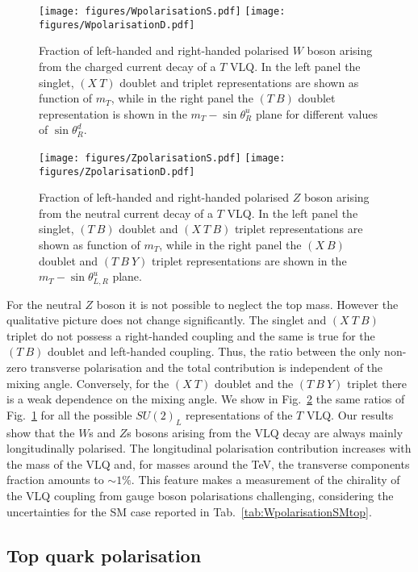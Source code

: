 \documentclass[a4paper]{article}
\begin{document}
\begin{figure}[!htbp]
\centering
\texttt{[image: figures/WpolarisationS.pdf]}
\texttt{[image: figures/WpolarisationD.pdf]}
\caption{Fraction of left-handed and right-handed polarised $W$ boson arising from the charged current decay of a $T$ VLQ. In the left panel the singlet, $(X~T)$ doublet and triplet representations are shown as function of $m_T$, while in the right panel the $(T~B)$ doublet representation is shown in the $m_T-\sin\theta^u_R$ plane for different values of $\sin\theta^d_R$.}
\label{fig:wpol}
\end{figure}
\begin{figure}[!htbp]
\centering
\texttt{[image: figures/ZpolarisationS.pdf]}
\texttt{[image: figures/ZpolarisationD.pdf]}
\caption{Fraction of left-handed and right-handed polarised $Z$ boson arising from the neutral current decay of a $T$ VLQ. In the left panel the singlet, $(T~B)$ doublet and $(X~T~B)$ triplet representations are shown as function of $m_T$, while in the right panel the $(X~B)$ doublet and $(T~B~Y)$ triplet representations are shown in the $m_T-\sin\theta^u_{L,R}$ plane.}
\label{fig:zpol}
\end{figure}

For the neutral $Z$ boson  it is not possible to neglect the top mass. However the qualitative picture does not change significantly. The singlet and $(X~T~B)$ triplet do not possess a right-handed coupling and the same is true for the $(T~B)$ doublet and left-handed coupling. Thus, the ratio between the only non-zero transverse polarisation and the total contribution is independent of the mixing angle. Conversely, for the $(X~T)$ doublet and the $(T~B~Y)$ triplet there is a weak dependence on the mixing angle. We show in Fig.~\ref{fig:zpol} the same ratios of Fig.~\ref{fig:wpol} for all the possible $SU(2)_L$ representations of the  $T$ VLQ. 
Our results show that the $W$s and $Z$s bosons arising from the VLQ decay are always mainly longitudinally polarised. The longitudinal polarisation contribution increases with the mass of the VLQ and, for masses around the TeV, the transverse components fraction amounts to $\sim 1\%$.
This feature makes a measurement of the chirality of the VLQ coupling from gauge boson polarisations challenging, considering the uncertainties for the SM case reported in Tab.~\ref{tab:WpolarisationSMtop}. 




\subsection{Top quark polarisation}
\label{sec:top-pol}
\end{document}

